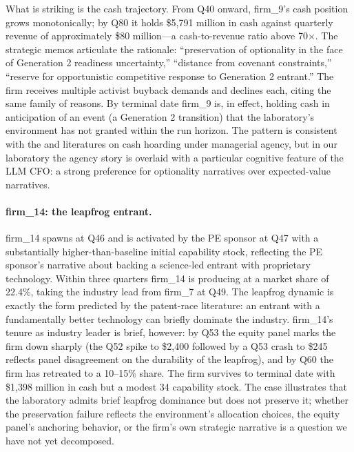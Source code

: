 \documentclass[11pt]{article}
\begin{document}
What is striking is the cash trajectory. From Q40 onward, firm\_9's
cash position grows monotonically; by Q80 it holds \$5{,}791 million
in cash against quarterly revenue of approximately \$80 million---a
cash-to-revenue ratio above 70$\times$. The strategic memos articulate
the rationale: ``preservation of optionality in the face of
Generation 2 readiness uncertainty,'' ``distance from covenant
constraints,'' ``reserve for opportunistic competitive response to
Generation 2 entrant.'' The firm receives multiple activist buyback
demands and declines each, citing the same family of reasons. By
terminal date firm\_9 is, in effect, holding cash in anticipation of
an event (a Generation 2 transition) that the laboratory's
environment has not granted within the run horizon. The pattern is
consistent with the \citet{harford2008corporate} and
\citet{nikolovwhited2013} literatures on cash hoarding under managerial
agency, but in our laboratory the agency story is overlaid with a
particular cognitive feature of the LLM CFO: a strong preference for
optionality narratives over expected-value narratives.

\paragraph{firm\_14: the leapfrog entrant.}
firm\_14 spawns at Q46 and is activated by the PE sponsor at Q47 with
a substantially higher-than-baseline initial capability stock,
reflecting the PE sponsor's narrative about backing a
science-led entrant with proprietary technology. Within three
quarters firm\_14 is producing at a market share of 22.4\%, taking the
industry lead from firm\_7 at Q49. The leapfrog dynamic is exactly
the form predicted by the \citet{reinganum1983uncertain}
patent-race literature: an entrant with a fundamentally better
technology can briefly dominate the industry. firm\_14's tenure as
industry leader is brief, however: by Q53 the equity panel marks the
firm down sharply (the Q52 spike to \$2{,}400 followed by a Q53 crash
to \$245 reflects panel disagreement on the durability of the
leapfrog), and by Q60 the firm has retreated to a 10--15\% share. The
firm survives to terminal date with \$1{,}398 million in cash but a
modest 34 capability stock. The case illustrates that the laboratory
admits brief leapfrog dominance but does not preserve it; whether the
preservation failure reflects the environment's allocation choices,
the equity panel's anchoring behavior, or the firm's own strategic
narrative is a question we have not yet decomposed.
\end{document}
